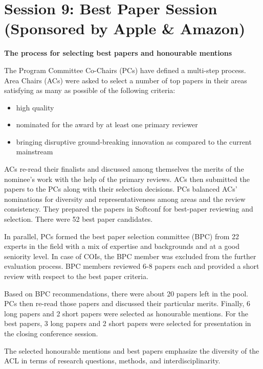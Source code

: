 \section{Session 9: Best Paper Session (Sponsored by Apple \& Amazon)}

\begin{center}
  {\Large \bf The process for selecting best papers and honourable mentions}
\end{center}

\vspace*{0.5cm}

The Program Committee Co-Chairs (PCs) have defined a multi-step process. Area Chairs (ACs) were asked to select a number of top papers in their areas satisfying as many as possible of the following criteria:
\begin{itemize}
\item high quality
\item nominated for the award by at least one primary reviewer
\item bringing disruptive ground-breaking innovation as compared to the current mainstream
\end{itemize}

ACs re-read their finalists and discussed among themselves the merits of the nominee's work with the help of the primary reviews. ACs then submitted the papers to the PCs along with their selection decisions. PCs balanced ACs' nominations for diversity and representativeness among areas and the review consistency. They  prepared the papers in Softconf for best-paper reviewing and selection. There were 52 best paper candidates.

In parallel, PCs formed the best paper selection committee (BPC) from 22 experts in the field with a mix of expertise and backgrounds and at a good seniority level. In case of COIs, the BPC member was excluded from the further evaluation process. BPC members reviewed 6-8 papers each and provided a short review with respect to the best paper criteria.

Based on BPC recommendations, there were about 20 papers left in the pool. PCs then re-read those papers and discussed their particular merits. Finally, 6 long papers and 2 short papers were selected as honourable mentions. For the best papers, 3 long papers and 2 short papers were selected for presentation in the closing conference session.

The selected honourable mentions and best papers emphasize the diversity of the ACL in terms of research questions, methods, and interdisciplinarity.

